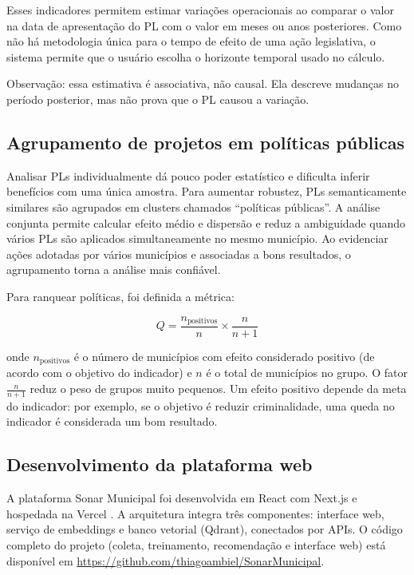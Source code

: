 \documentclass[10pt,a4paper]{article}
\begin{document}
Esses indicadores permitem estimar variações operacionais ao comparar o valor na data de apresentação do PL com o valor em meses ou anos posteriores. Como não há metodologia única para o tempo de efeito de uma ação legislativa, o sistema permite que o usuário escolha o horizonte temporal usado no cálculo.

Observação: essa estimativa é associativa, não causal. Ela descreve mudanças no período posterior, mas não prova que o PL causou a variação.

\subsection{Agrupamento de projetos em políticas públicas}
\label{sec:agrupamento}

Analisar PLs individualmente dá pouco poder estatístico e dificulta inferir benefícios com uma única amostra. Para aumentar robustez, PLs semanticamente similares são agrupados em clusters chamados ``políticas públicas''. A análise conjunta permite calcular efeito médio e dispersão e reduz a ambiguidade quando vários PLs são aplicados simultaneamente no mesmo município. Ao evidenciar ações adotadas por vários municípios e associadas a bons resultados, o agrupamento torna a análise mais confiável.

Para ranquear políticas, foi definida a métrica:

\[
Q = \frac{n_{\text{positivos}}}{n} \times \frac{n}{n+1}
\]

onde $n_{\text{positivos}}$ é o número de municípios com efeito considerado positivo (de acordo com o objetivo do indicador) e $n$ é o total de municípios no grupo. O fator $\frac{n}{n+1}$ reduz o peso de grupos muito pequenos. Um efeito positivo depende da meta do indicador: por exemplo, se o objetivo é reduzir criminalidade, uma queda no indicador é considerada um bom resultado.

\subsection{Desenvolvimento da plataforma web}
\label{sec:plataforma}

A plataforma Sonar Municipal foi desenvolvida em React com Next.js e hospedada na Vercel \cite{vercel_nextjs}. A arquitetura integra três componentes: interface web, serviço de embeddings e banco vetorial (Qdrant), conectados por APIs. O código completo do projeto (coleta, treinamento, recomendação e interface web) está disponível em \url{https://github.com/thiagoambiel/SonarMunicipal}.
\end{document}
